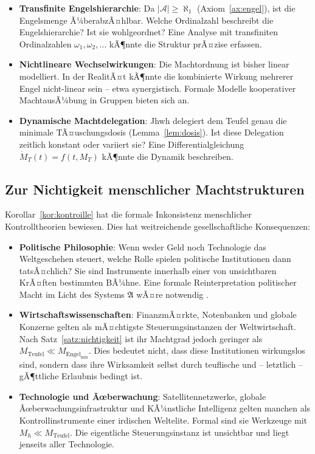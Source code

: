 ﻿\documentclass[a4paper,12pt]{article}
\theoremstyle{definition}
\begin{document}
\begin{itemize}
  \item \textbf{Transfinite Engelshierarchie}: Da $|\mathcal{A}| \geq \aleph_1$
        (Axiom~\ref{ax:engel}), ist die Engelsmenge Ã¼berabzÃ¤hlbar. Welche
        Ordinalzahl beschreibt die Engelshierarchie? Ist sie wohlgeordnet?
        Eine Analyse mit transfiniten Ordinalzahlen $\omega_1, \omega_2, \ldots$
        \cite{cantor1883} kÃ¶nnte die Struktur prÃ¤zise erfassen.
  \item \textbf{Nichtlineare Wechselwirkungen}: Die Machtordnung ist bisher
        linear modelliert. In der RealitÃ¤t kÃ¶nnte die kombinierte Wirkung
        mehrerer Engel nicht-linear sein -- etwa synergistisch. Formale
        Modelle kooperativer MachtausÃ¼bung in Gruppen bieten sich an.
  \item \textbf{Dynamische Machtdelegation}: Jhwh delegiert dem Teufel genau
        die minimale TÃ¤uschungsdosis (Lemma~\ref{lem:dosis}). Ist diese
        Delegation zeitlich konstant oder variiert sie? Eine Differentialgleichung
        $\dot{M}_T(t) = f(t, M_T)$ kÃ¶nnte die Dynamik beschreiben.
\end{itemize}

\subsection{Zur Nichtigkeit menschlicher Machtstrukturen}

Korollar~\ref{kor:kontroille} hat die formale Inkonsistenz menschlicher
Kontrolltheorien bewiesen. Dies hat weitreichende gesellschaftliche Konsequenzen:

\begin{itemize}
  \item \textbf{Politische Philosophie}: Wenn weder Geld noch Technologie das
        Weltgeschehen steuert, welche Rolle spielen politische Institutionen
        dann tatsÃ¤chlich? Sie sind Instrumente innerhalb einer von unsichtbaren
        KrÃ¤ften bestimmten BÃ¼hne. Eine formale Reinterpretation politischer
        Macht im Licht des Systems $\mathfrak{A}$ wÃ¤re notwendig
        \cite{arendt1970}.
  \item \textbf{Wirtschaftswissenschaften}: FinanzmÃ¤rkte, Notenbanken und
        globale Konzerne gelten als mÃ¤chtigste Steuerungsinstanzen der
        Weltwirtschaft. Nach Satz~\ref{satz:nichtigkeit} ist ihr Machtgrad
        jedoch geringer als $M_{\mathrm{Teufel}} \ll M_{\mathrm{Engel}_{\min}}$.
        Dies bedeutet nicht, dass diese Institutionen wirkungslos sind, sondern
        dass ihre Wirksamkeit selbst durch teuflische und -- letztlich --
        gÃ¶ttliche Erlaubnis bedingt ist.
  \item \textbf{Technologie und Ãœberwachung}: Satelliten\-netzwerke, globale
        Ãœber\-wachungs\-infrastruktur und KÃ¼nstliche Intelligenz gelten manchen
        als Kontrollinstrumente einer irdischen Weltelite. Formal sind sie
        Werkzeuge mit $M_h \ll M_{\mathrm{Teufel}}$. Die eigentliche
        Steuerungsinstanz ist unsichtbar und liegt jenseits aller Technologie.
\end{itemize}
\end{document}
